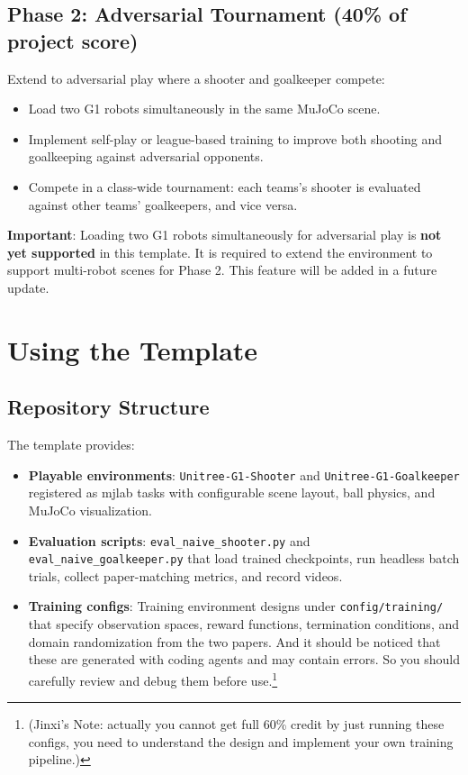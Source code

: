 \documentclass{article}
\begin{document}
\subsection{Phase 2: Adversarial Tournament (40\% of project score)}

Extend to adversarial play where a shooter and goalkeeper compete:

\begin{itemize}
  \item Load two G1 robots simultaneously in the same MuJoCo scene.
  \item Implement self-play or league-based training to improve both shooting and goalkeeping against adversarial opponents.
  \item Compete in a class-wide tournament: each teams's shooter is evaluated against other teams' goalkeepers, and vice versa.
\end{itemize}

\textbf{Important}: Loading two G1 robots simultaneously for adversarial play is \textbf{not yet supported} in this template. It is required to extend the environment to support multi-robot scenes for Phase 2. This feature will be added in a future update.

\section{Using the Template}

\subsection{Repository Structure}

The template provides:

\begin{itemize}
  \item \textbf{Playable environments}: \texttt{Unitree-G1-Shooter} and \texttt{Unitree-G1-Goalkeeper} registered as mjlab tasks with configurable scene layout, ball physics, and MuJoCo visualization.
  \item \textbf{Evaluation scripts}: \texttt{eval\_naive\_shooter.py} and \texttt{eval\_naive\_goalkeeper.py} that load trained checkpoints, run headless batch trials, collect paper-matching metrics, and record videos.
  \item \textbf{Training configs}: Training environment designs under \texttt{config/training/} that specify observation spaces, reward functions, termination conditions, and domain randomization from the two papers. And it should be noticed that these are generated with coding agents and may contain errors. So you should carefully review and debug them before use.\footnote{(Jinxi's Note: actually you cannot get full 60\% credit by just running these configs, you need to understand the design and implement your own training pipeline.)}
\end{itemize}
\end{document}
